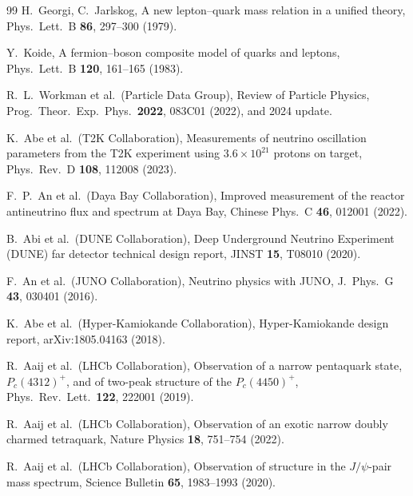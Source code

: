 \documentclass[11pt,a4paper]{article}
\theoremstyle{definition}
\theoremstyle{remark}
\begin{document}
\begin{thebibliography}{99}
 H.~Georgi, C.~Jarlskog, A new lepton--quark mass relation in a unified theory, Phys.\ Lett.\ B \textbf{86}, 297--300 (1979).

 Y.~Koide, A fermion--boson composite model of quarks and leptons, Phys.\ Lett.\ B \textbf{120}, 161--165 (1983).

 R.~L.~Workman et al.\ (Particle Data Group), Review of Particle Physics, Prog.\ Theor.\ Exp.\ Phys.\ \textbf{2022}, 083C01 (2022), and 2024 update.

 K.~Abe et al.\ (T2K Collaboration), Measurements of neutrino oscillation parameters from the T2K experiment using $3.6\times 10^{21}$ protons on target, Phys.\ Rev.\ D \textbf{108}, 112008 (2023).

 F.~P.~An et al.\ (Daya Bay Collaboration), Improved measurement of the reactor antineutrino flux and spectrum at Daya Bay, Chinese Phys.\ C \textbf{46}, 012001 (2022).

 B.~Abi et al.\ (DUNE Collaboration), Deep Underground Neutrino Experiment (DUNE) far detector technical design report, JINST \textbf{15}, T08010 (2020).

 F.~An et al.\ (JUNO Collaboration), Neutrino physics with JUNO, J.\ Phys.\ G \textbf{43}, 030401 (2016).

 K.~Abe et al.\ (Hyper-Kamiokande Collaboration), Hyper-Kamiokande design report, arXiv:1805.04163 (2018).

 R.~Aaij et al.\ (LHCb Collaboration), Observation of a narrow pentaquark state, $P_c(4312)^+$, and of two-peak structure of the $P_c(4450)^+$, Phys.\ Rev.\ Lett.\ \textbf{122}, 222001 (2019).

 R.~Aaij et al.\ (LHCb Collaboration), Observation of an exotic narrow doubly charmed tetraquark, Nature Physics \textbf{18}, 751--754 (2022).

 R.~Aaij et al.\ (LHCb Collaboration), Observation of structure in the $J/\psi$-pair mass spectrum, Science Bulletin \textbf{65}, 1983--1993 (2020).

\end{thebibliography}
\end{document}
